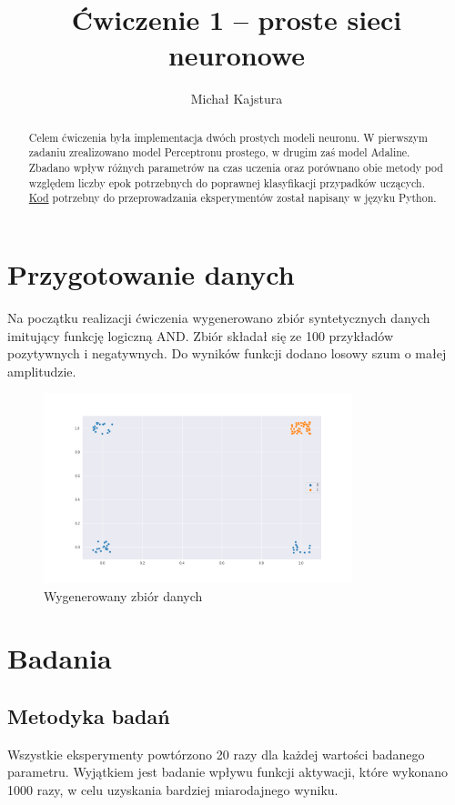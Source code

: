 \documentclass{article}
\title{Ćwiczenie 1 – proste sieci neuronowe}
\author{Michał Kajstura}
\begin{document}
\maketitle

\begin{abstract}
 Celem ćwiczenia była implementacja dwóch prostych modeli neuronu.
 W pierwszym zadaniu zrealizowano model Perceptronu prostego, w drugim zaś
 model Adaline. Zbadano wpływ różnych parametrów na czas uczenia oraz porównano
 obie metody pod względem liczby epok potrzebnych do poprawnej klasyfikacji przypadków uczących. \href{https://github.com/michalkaj/sieci_neuronowe_7_sem}{Kod} potrzebny do przeprowadzania eksperymentów został napisany w języku Python.
\end{abstract}
\tableofcontents
\pagebreak

\section{Przygotowanie danych}
Na początku realizacji ćwiczenia wygenerowano zbiór syntetycznych danych 
imitujący funkcję logiczną AND.
Zbiór składał się ze 100 przykładów pozytywnych i negatywnych.
Do wyników funkcji dodano losowy szum o małej amplitudzie.

\begin{figure}[h]
  \caption{Wygenerowany zbiór danych}
  \centering
    \includegraphics[width=0.8\textwidth]{images/01_data.png}
\end{figure}

\section{Badania}

\subsection{Metodyka badań}
Wszystkie eksperymenty powtórzono 20 razy dla każdej wartości badanego parametru.
Wyjątkiem jest badanie wpływu funkcji aktywacji, które wykonano 1000 razy, w celu
uzyskania bardziej miarodajnego wyniku. 
\end{document}
